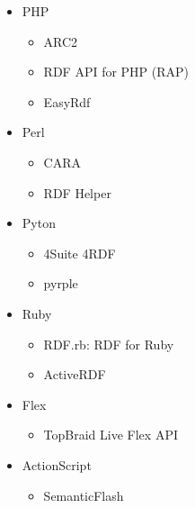 \documentclass[xcolor=dvipsnames]{beamer}
\begin{document}
\begin{frame}[plain]
\begin{columns}
\begin{itemize}
	\item PHP
		\begin{itemize}
			\item ARC2
			\item RDF API for PHP (RAP)
			\item EasyRdf
		\end{itemize}
	\item Perl
		\begin{itemize}
			\item CARA
			\item RDF Helper
		\end{itemize}
	\item Pyton
		\begin{itemize}
			\item 4Suite 4RDF
			\item pyrple 
		\end{itemize}
	\item Ruby
		\begin{itemize}
			\item RDF.rb: RDF for Ruby  
			\item ActiveRDF 
		\end{itemize}
	\item Flex
		\begin{itemize}
			\item TopBraid Live Flex API 
		\end{itemize}
	\item ActionScript
		\begin{itemize}
			\item SemanticFlash 
		\end{itemize}
\end{itemize}
\end{columns}
\end{frame}
\end{document}
